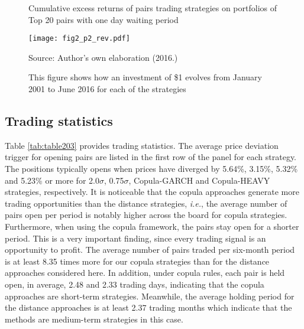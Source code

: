 \documentclass[a4paper,12pt]{report}
\begin{document}
\begin{refsection}
\begin{figure}[H]
	\centering
	\caption{Cumulative excess returns of pairs trading strategies on portfolios of Top 20 pairs with one day waiting period}
	\texttt{[image: fig2\_p2\_rev.pdf]}
	\captionsetup{justification=raggedright,
		singlelinecheck=false
	}
	\caption*{Source: Author's own elaboration (2016.)}
	\caption*{This figure shows how an investment of \$1 evolves from January 2001 to June 2016 for each of the strategies}
	\label{fig:fig204}
\end{figure}

\vspace{0.3cm}

\subsection{Trading statistics}

Table \ref{tab:table203} provides trading statistics. The average price deviation trigger for opening pairs are listed in the first row of the panel for each strategy. The positions typically opens when prices have diverged by 5.64\%, 3.15\%, 5.32\% and 5.23\% or more for 2.0$\sigma$, 0.75$\sigma$, Copula-GARCH and Copula-HEAVY strategies, respectively. It is noticeable that the copula approaches generate more trading opportunities than the distance strategies, \emph{i.e.}, the average number of pairs open per period is notably higher across the board for copula strategies. Furthermore, when using the copula framework, the pairs stay open for a shorter period. This is a very important finding, since every trading signal is an opportunity to profit. The average number of pairs traded per six-month period is at least 8.35 times more for our copula strategies than for the distance approaches considered here. In addition, under copula rules, each pair is held open, in average, 2.48 and 2.33 trading days, indicating that the copula approaches are short-term strategies. Meanwhile, the average holding period for the distance approaches is at least 2.37 trading months which indicate that the methods are medium-term strategies in this case.\\


\end{refsection}
\end{document}

